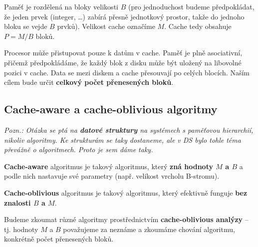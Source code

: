 \documentclass[11pt]{report} %
\numberwithin{equation}{section}
\begin{document}
Paměť je rozdělená na bloky velikosti $B$ (pro jednoduchost budeme předpokládat, že jeden prvek (integer, \dots) zabírá přesně jednotkový prostor, takže do jednoho bloku se vejde $B$ prvků). Velikost cache označíme $M$. Cache tedy obsahuje $P = M/B$ bloků. 

Procesor může přistupovat pouze k datům v cache. Paměť je plně asociativní, přičemž předpokládáme, že každý blok z disku může být uložený na libovolné pozici v cache. Data se mezi diskem a cache přesouvají po celých blocích. Naším cílem bude určit \textbf{celkový počet přenesených bloků}.

\subsection{Cache-aware a cache-oblivious algoritmy}
\textit{Pozn.: Otázka se ptá na \textbf{datové struktury} na systémech s paměťovou hierarchií, nikoliv algoritmy. Ke strukturám se taky dostaneme, ale v DS bylo tohle téma převážně o algoritmech. Proto je sem dáme taky.}

\textbf{Cache-aware} algoritmus je takový algoritmus, který \textbf{zná hodnoty $M$ a $B$} a podle nich nastavuje své parametry (např. velikost vrcholu B-stromu).

\textbf{Cache-oblivious} algoritmus je takový algoritmus, který efektivně funguje \textbf{bez znalosti $B$ a $M$}. 

Budeme zkoumat různé algoritmy prostřednictvím \textbf{cache-oblivious analýzy} -- tj. hodnoty $M$ a $B$ považujeme za neznáme a zkoumáme chování algoritmu, konkrétně počet přenesených bloků. 
\end{document}
